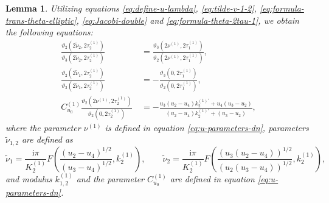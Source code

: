 \documentclass[11pt,reqno]{amsart}
\newcommand{\ii}{\mathrm{i}}
\newtheorem{lemma}{Lemma}
\numberwithin{equation}{section}
\begin{document}
\begin{lemma}\label{lemma:parameter-hat}
	Utilizing equations \eqref{eq:define-u-lambda}, \eqref{eq:tilde-v-1-2}, \eqref{eq:formula-trans-theta-elliptic}, \eqref{eq:Jacobi-double} and \eqref{eq:formula-theta-2tau-1},
	we obtain the following equations:
	\begin{subequations}\label{eq:equ-1}
		\begin{align}
			\frac{\vartheta_2(2\tilde{\nu}_2,2  \tau^{(1)}_2)}{\vartheta_3(2\tilde{\nu}_2,2  \tau^{(1)}_2)} & \  =
			\frac{\vartheta_3(2 \nu^{(1)} ,2  \tau^{(1)}_1)}{\vartheta_2(2 \nu^{(1)} ,2  \tau^{(1)}_1)},  \label{eq:equ-1-a}\\
			 \frac{\vartheta_2(2\tilde{\nu}_1,2  \tau^{(1)}_2)}{\vartheta_3(2\tilde{\nu}_1,2  \tau^{(1)}_2)}& \  =  -\frac{\vartheta_3(0,2  \tau^{(1)}_1)}{\vartheta_2(0,2  \tau^{(1)}_1)}, \label{eq:equ-1-b}\\
			C_{u_0}^{(1)}\frac{\vartheta_2(2 \nu^{(1)} ,2  \tau^{(1)}_2)}{\vartheta_2(0,2  \tau^{(1)}_2)}& \  =-\frac{u_3(u_2-u_4)  k^{(1)\prime}_2+u_4(u_3-u_2)}{(u_2-u_4)  k^{(1)\prime}_2+(u_3-u_2)}, \label{eq:equ-1-c}
		\end{align}
	\end{subequations}
	where the parameter $\nu^{(1)}$ is defined in equation \eqref{eq:u-parameters-dn}, parameters $\tilde{\nu}_{1,2}$ are defined as
	\begin{equation}\label{eq:tilde-v-1-2}
		\tilde{\nu}_1=\frac{\ii \pi}{  K^{(1)}_2} F\left(\frac{(u_2-u_4)^{1/2}}{(u_3-u_4)^{1/2}},  k^{(1)}_2\right),\qquad
		\tilde{\nu}_2=\frac{\ii \pi}{  K^{(1)}_2} F\left(\frac{(u_3(u_2-u_4))^{1/2}}{(u_2(u_3-u_4))^{1/2}},  k^{(1)}_2\right),
	\end{equation}
	and modulus $  k^{(1)}_{1,2}$ and the parameter $ C_{u_0}^{(1)}$ are defined in equation \eqref{eq:u-parameters-dn}.
\end{lemma}
\end{document}
